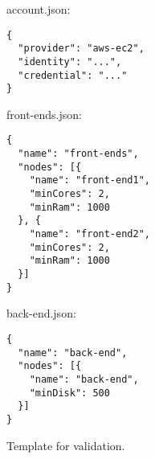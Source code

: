 \begin{figure}[tb]
  \begin{center}
    account.json:
    \begin{verbatim}
{
  "provider": "aws-ec2", 
  "identity": "...",
  "credential": "..."
}
    \end{verbatim}
    front-ends.json:
    \begin{verbatim}
{
  "name": "front-ends",
  "nodes": [{   
    "name": "front-end1",
    "minCores": 2,
    "minRam": 1000
  }, {   
    "name": "front-end2",
    "minCores": 2,
    "minRam": 1000
  }]
}
    \end{verbatim}
    back-end.json:
    \begin{verbatim}
{
  "name": "back-end",
  "nodes": [{   
    "name": "back-end",
    "minDisk": 500
  }]
}
    \end{verbatim}
  \end{center}
  \caption{Template for validation.}
  \label{list:validation-threenodes}
\end{figure}

